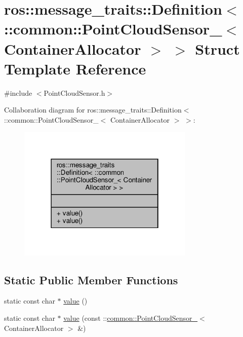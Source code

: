 \hypertarget{structros_1_1message__traits_1_1Definition_3_01_1_1common_1_1PointCloudSensor___3_01ContainerAllocator_01_4_01_4}{}\section{ros\+:\+:message\+\_\+traits\+:\+:Definition$<$ \+:\+:common\+:\+:Point\+Cloud\+Sensor\+\_\+$<$ Container\+Allocator $>$ $>$ Struct Template Reference}
\label{structros_1_1message__traits_1_1Definition_3_01_1_1common_1_1PointCloudSensor___3_01ContainerAllocator_01_4_01_4}


{\ttfamily \#include $<$Point\+Cloud\+Sensor.\+h$>$}



Collaboration diagram for ros\+:\+:message\+\_\+traits\+:\+:Definition$<$ \+:\+:common\+:\+:Point\+Cloud\+Sensor\+\_\+$<$ Container\+Allocator $>$ $>$\+:\nopagebreak
\begin{figure}[H]
\begin{center}
\leavevmode
\includegraphics[width=238pt]{d7/d15/structros_1_1message__traits_1_1Definition_3_01_1_1common_1_1PointCloudSensor___3_01ContainerAllocator_01_4_01_4__coll__graph}
\end{center}
\end{figure}
\subsection*{Static Public Member Functions}
\begin{DoxyCompactItemize}
\item 
static const char $\ast$ \hyperlink{structros_1_1message__traits_1_1Definition_3_01_1_1common_1_1PointCloudSensor___3_01ContainerAllocator_01_4_01_4_a34643ea912d811df187947080c424d57}{value} ()
\item 
static const char $\ast$ \hyperlink{structros_1_1message__traits_1_1Definition_3_01_1_1common_1_1PointCloudSensor___3_01ContainerAllocator_01_4_01_4_a923d337ff28f4ad0f401626ff33bdf60}{value} (const \+::\hyperlink{structcommon_1_1PointCloudSensor__}{common\+::\+Point\+Cloud\+Sensor\+\_\+}$<$ Container\+Allocator $>$ \&)
\end{DoxyCompactItemize}


